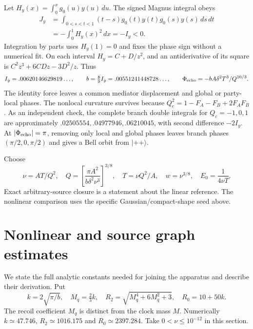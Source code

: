 \documentclass[11pt]{article}
\begin{document}
Let $H_y(x)=\int_0^xg_0(u)y(u)\,du$.
The signed Magnus integral obeys
\begin{align}
 J_y&=\int_{0<s<t<1}(t-s)g_0(t)y(t)g_0(s)y(s)\,ds\,dt\nonumber\\
 &=-\int_0^1H_y(x)^2\,dx=-I_y<0.\label{eq:Magnus}
\end{align}
Integration by parts uses $H_y(1)=0$ and fixes the phase sign without a numerical fit.
On each interval $H_y=C+D/z^2$, and an antiderivative of its square is $C^2z^3+6CDz-3D^2/z$.
Thus
\begin{equation}
 I_y=.00620146629819\ldots,\qquad
 b=\tfrac89I_y=.00551241448728\ldots,\qquad
 \Phi_{\rm echo}=-bA\delta^2T^3/Q^{10/3}.\label{eq:phase}
\end{equation}
The identity force leaves a common mediator displacement and global or party-local phases.
The nonlocal curvature survives because $Q_c^2=1-F_A-F_B+2F_AF_B$.
As an independent check, the complete branch double integrals for $Q_c=-1,0,1$ are approximately $.02505554,.04977946,.06210045$, with second difference $-2I_y$.
At $|\Phi_{\rm echo}|=\pi$, removing only local and global phases leaves branch phases $(\pi/2,0,\pi/2)$ and gives a Bell orbit from $|++\rangle$.

Choose
\begin{equation}
 \nu=AT/Q^2,\quad Q=\left[\frac{\pi A^2}{b\delta^2\nu^3}\right]^{3/8},\quad
 T=\nu Q^2/A,\quad w=\nu^{3/8},\quad E_0=\frac1{4\nu T}.\label{eq:scales}
\end{equation}
Exact arbitrary-source closure is a statement about the linear reference.
The nonlinear comparison uses the specific Gaussian/compact-shape seed above.

\section{Nonlinear and source graph estimates}\label{sec:nonlinear}

We state the full analytic constants needed for joining the apparatus and describe their derivation.
Put
\begin{equation}
 k=2\sqrt{\pi/b},\quad M_q=\tfrac23k,\quad
 R_2=\sqrt{M_q^4+6M_q^2+3},\quad R_0=10+50k.\label{eq:constants}
\end{equation}
The recoil coefficient $M_q$ is distinct from the clock mass $M$.
Numerically $k\simeq47.746$, $R_2\simeq1016.175$ and $R_0\simeq2397.284$.
Take $0<\nu\le10^{-12}$ in this section.
\end{document}
